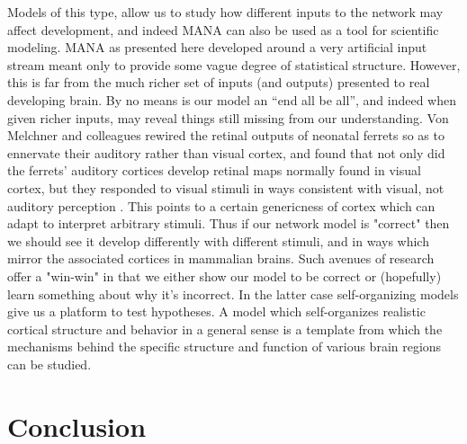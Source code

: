 \documentclass[10pt,letterpaper]{article}
\begin{document}
Models of this type, allow us to study how different inputs to the network may affect development, and indeed MANA can also be used as a tool for scientific modeling. MANA as presented here developed around a very artificial input stream meant only to provide some vague degree of statistical structure. However, this is far from the much richer set of inputs (and outputs) presented to real developing brain. By no means is our model an ``end all be all'', and indeed when given richer inputs, may reveal things still missing from our understanding. Von Melchner and colleagues rewired the retinal outputs of neonatal ferrets so as to ennervate their auditory rather than visual cortex, and found that not only did the ferrets' auditory cortices develop retinal maps normally found in visual cortex, but they responded to visual stimuli in ways consistent with visual, not auditory perception \cite{von2000visual}. This points to a certain genericness of cortex which can adapt to interpret arbitrary stimuli. Thus if our network model is "correct" then we should see it develop differently with different stimuli, and in ways which mirror the associated cortices in mammalian brains. Such avenues of research offer a "win-win" in that we either show our model to be correct or (hopefully) learn something about why it's incorrect. In the latter case self-organizing models give us a platform to test hypotheses. A model which self-organizes realistic cortical structure and behavior in a general sense is a template from which the mechanisms behind the specific structure and function of various brain regions can be studied. 	

\section*{Conclusion}
\end{document}
